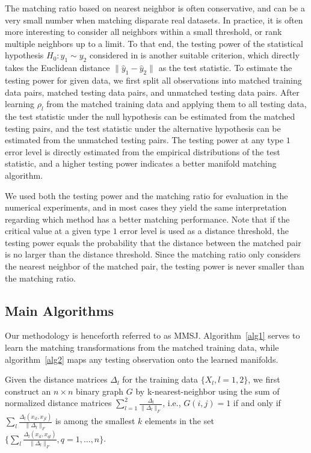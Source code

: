 \documentclass[times,twocolumn,final]{elsarticle}
\begin{document}
The matching ratio based on nearest neighbor is often conservative, and can be a very small number when matching disparate real datasets. In practice, it is often more interesting to consider all neighbors within a small threshold, or rank multiple neighbors up to a limit. To that end, the testing power of the statistical hypothesis $H_{0}: y_{1} \sim y_{2}$ considered in \citep{PriebeMarchette2012} is another suitable criterion, which directly takes the Euclidean distance $\|\hat{y}_{1}- \hat{y}_{2}\|$ as the test statistic. To estimate the testing power for given data, we first split all observations into matched training data pairs, matched testing data pairs, and unmatched testing data pairs. After learning $\rho_{l}$ from the matched training data and applying them to all testing data, the test statistic under the null hypothesis can be estimated from the matched testing pairs, and the test statistic under the alternative hypothesis can be estimated from the unmatched testing pairs. The testing power at any type $1$ error level is directly estimated from the empirical distributions of the test statistic, and a higher testing power indicates a better manifold matching algorithm. 

We used both the testing power and the matching ratio for evaluation in the numerical experiments, and in most cases they yield the same interpretation regarding which method has a better matching performance. Note that if the critical value at a given type $1$ error level is used as a distance threshold, the testing power equals the probability that the distance between the matched pair is no larger than the distance threshold. Since the matching ratio only considers the nearest neighbor of the matched pair, the testing power is never smaller than the matching ratio.

\subsection{Main Algorithms}
\label{main1}
Our methodology is henceforth referred to as MMSJ. Algorithm~\ref{alg1} serves to learn the matching transformations from the matched training data, while algorithm~\ref{alg2} maps any testing observation onto the learned manifolds.

Given the distance matrices $\Delta_{l}$ for the training data $\{X_{l}, l=1,2\}$, we first construct an $n \times n$ binary graph $G$ by k-nearest-neighbor using the sum of normalized distance matrices $\sum_{l=1}^{2} \frac{\Delta_{l}}{\|\Delta_{l}\|_{F}}$, i.e., $G(i,j)=1$ if and only if $\sum_{l} \frac{\Delta_{l}(x_{il},x_{jl})}{\|\Delta_{l}\|_{F}}$ is among the smallest $k$ elements in the set $\{ \sum_{l} \frac{\Delta_{l}(x_{il},x_{ql})} {\|\Delta_{l}\|_{F}}, q=1,\ldots,n \}$.
\end{document}
